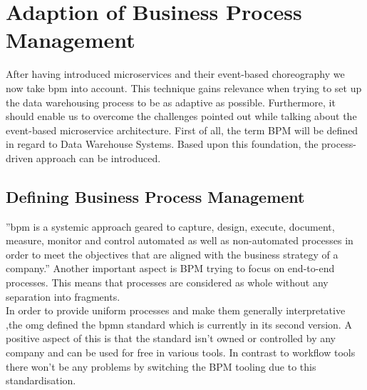 \section{Adaption of Business Process Management}
\label{sec:bpm}
After having introduced microservices and their event-based choreography we now take \acrfull{bpm} into account. This technique gains relevance when trying to set up the data warehousing process to be as adaptive as possible. Furthermore, it should enable us to overcome the challenges pointed out while talking about the event-based microservice architecture.\newline
First of all, the term BPM will be defined in regard to Data Warehouse Systems. Based upon this foundation, the process-driven approach can be introduced. 

\subsection{Defining Business Process Management}
''\acrfull{bpm} is a systemic approach geared to capture, design, execute, document, measure, monitor and control automated as well as non-automated processes in order to meet the objectives that are aligned with the business strategy of a company.'' \cite{bpmDef} Another important aspect is BPM trying to focus on end-to-end processes. This means that processes are considered as whole without any separation into fragments. \cite{praxisBPM}\newline
\\
In order to provide uniform processes and make them generally interpretative ,the \acrfull{omg} defined the \acrfull{bpmn} standard which is currently in its second version. A positive aspect of this is that the standard isn't owned or controlled by any company and can be used for free in various tools. In contrast to workflow tools there won't be any problems by switching the BPM tooling due to this standardisation. \cite{bpmMethodStyle}

